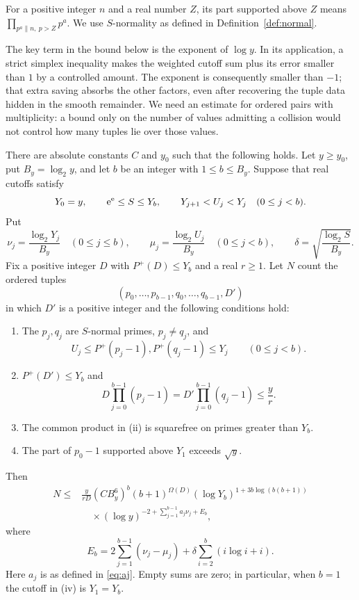 For a positive integer $n$ and a real number $Z$, its part supported
above $Z$ means $\prod_{p^a\parallel n,\ p>Z}p^a$.  We use
$S$-normality as defined in Definition~\ref{def:normal}.

The key term in the bound below is the exponent of $\log y$.
In its application, a strict simplex inequality makes
the weighted cutoff sum plus its error smaller than $1$ by a
controlled amount.
The exponent is consequently smaller than $-1$; that extra saving
absorbs the other factors, even after recovering the tuple data hidden
in the smooth remainder. We need an estimate for ordered pairs with
multiplicity: a bound only on the number of values admitting a collision
would not control how many tuples lie over those values.

\begin{proposition}\label{prop:comparison}
There are absolute constants $C$ and $y_0$ such that the following
holds.  Let $y\ge y_0$, put $B_y=\log_2 y$, and let $b$ be an integer
with $1\le b\le B_y$.  Suppose that real cutoffs satisfy
\[
 Y_0=y,\qquad \mathrm e^\mathrm e\le S\le Y_b,
 \qquad Y_{j+1}<U_j<Y_j\quad(0\le j<b).
\]
Put
\[
 \nu_j=\frac{\log_2 Y_j}{B_y}\quad(0\le j\le b),
 \qquad
 \mu_j=\frac{\log_2 U_j}{B_y}\quad(0\le j<b),
 \qquad
 \delta=\sqrt{\frac{\log_2 S}{B_y}}.
\]
Fix a positive integer $D$ with $P^+(D)\le Y_b$ and a real $r\ge1$.
Let $N$ count the ordered tuples
\[
 (p_0,\ldots,p_{b-1},q_0,\ldots,q_{b-1},D')
\]
in which $D'$ is a positive integer and the following conditions hold:
\begin{enumerate}[label=\textup{(\roman*)}]
 \item The $p_j,q_j$ are $S$-normal primes, $p_j\ne q_j$, and
 \[
  U_j\le P^+(p_j-1),P^+(q_j-1)\le Y_j
  \qquad(0\le j<b).
 \]
 \item $P^+(D')\le Y_b$ and
 \[
  D\prod_{j=0}^{b-1}(p_j-1)
  =D'\prod_{j=0}^{b-1}(q_j-1)\le\frac yr.
 \]
 \item The common product in \textup{(ii)} is squarefree on primes
 greater than $Y_b$.
 \item The part of $p_0-1$ supported above $Y_1$ exceeds $\sqrt y$.
\end{enumerate}
Then
\begin{equation}\label{eq:comparison}
 \begin{split}
 N\le{}&\frac{y}{rD}(CB_y^6)^b(b+1)^{\Omega(D)}
       (\log Y_b)^{1+3b\log(b(b+1))}\\
 &\quad\times
 (\log y)^{-2+\sum_{j=1}^{b-1}a_j\nu_j+E_b},
 \end{split}
\end{equation}
where
\begin{equation}\label{eq:comparison-error}
 E_b=2\sum_{j=1}^{b-1}(\nu_j-\mu_j)
      +\delta\sum_{i=2}^b(i\log i+i).
\end{equation}
Here $a_j$ is as defined in \eqref{eq:aj}.  Empty sums are zero;
in particular, when $b=1$ the cutoff in
\textup{(iv)} is $Y_1=Y_b$.
\end{proposition}

